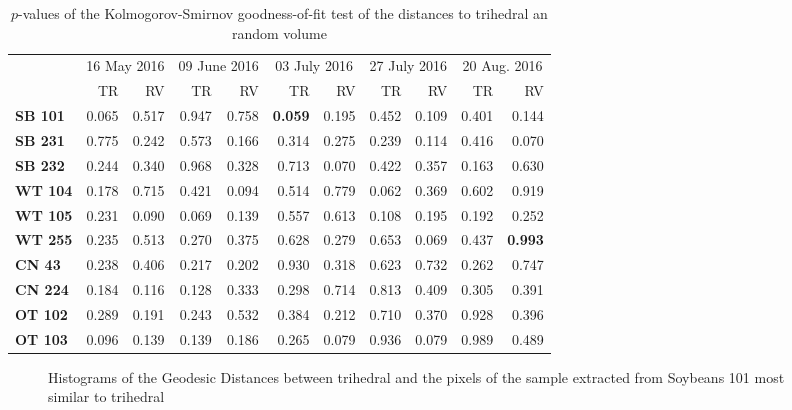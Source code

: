 \documentclass[12pt]{article}
\begin{document}
\begin{table}[hbt]
\centering
\caption{$p$-values of the Kolmogorov-Smirnov goodness-of-fit test of the distances to trihedral an random volume}\label{tab:pvalues_table}
\begin{tabular}{lrrrrrrrrrr}

\toprule
& \multicolumn{2}{c}{16 May 2016} & \multicolumn{2}{c}{09 June 2016} & \multicolumn{2}{c}{03 July 2016} & \multicolumn{2}{c}{27 July 2016} & \multicolumn{2}{c}{20 Aug. 2016}\\
& TR & RV & TR & RV & TR & RV & TR & RV& TR & RV\\
\cmidrule(lr){2-11}
\textbf{SB 101} & 0.065 & 0.517 & 0.947 & 0.758 & \textbf{0.059} & 0.195 & 0.452 & 0.109 & 0.401 & 0.144\\
\textbf{SB 231} & 0.775 & 0.242 & 0.573 & 0.166 & 0.314 & 0.275 & 0.239 & 0.114 & 0.416 & 0.070\\
\textbf{SB 232} & 0.244 & 0.340 & 0.968 & 0.328 & 0.713 & 0.070 & 0.422 & 0.357 & 0.163 & 0.630\\
\textbf{WT 104} & 0.178 & 0.715 & 0.421 & 0.094 & 0.514 & 0.779 & 0.062 & 0.369 & 0.602 & 0.919\\
\textbf{WT 105} & 0.231 & 0.090 & 0.069 & 0.139 & 0.557 & 0.613 & 0.108 & 0.195 & 0.192 & 0.252\\
\textbf{WT 255} & 0.235 & 0.513 & 0.270 & 0.375 & 0.628 & 0.279 & 0.653 & 0.069 & 0.437 & \textbf{0.993}\\
\textbf{CN 43}  & 0.238 & 0.406 & 0.217 & 0.202 & 0.930 & 0.318 & 0.623 & 0.732 & 0.262 & 0.747\\
\textbf{CN 224} & 0.184 & 0.116 & 0.128 & 0.333 & 0.298 & 0.714 & 0.813 & 0.409 & 0.305 & 0.391\\
\textbf{OT 102} & 0.289 & 0.191 & 0.243 & 0.532 & 0.384 & 0.212 & 0.710 & 0.370 & 0.928 & 0.396\\
\textbf{OT 103} & 0.096 & 0.139 & 0.139 & 0.186 & 0.265 & 0.079 & 0.936 & 0.079 & 0.989 & 0.489\\
\bottomrule
\end{tabular}
\end{table}

\begin{figure}[hbt]
\centering
{}
\caption{Histograms of the Geodesic Distances between trihedral and the pixels of the sample extracted from Soybeans 101 most similar to trihedral}
\label{fig:sb101_hist_tri}
\end{figure}
\end{document}
